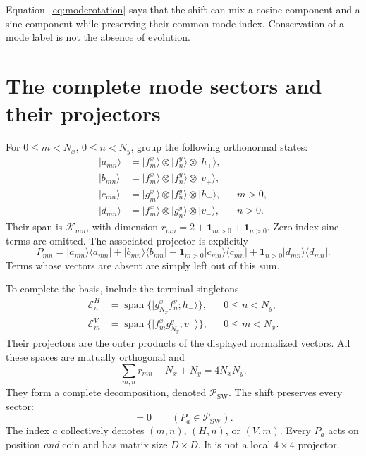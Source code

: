 \documentclass[11pt,a4paper,oneside]{report}
\newcommand{\ket}[1]{\lvert #1\rangle}
\newcommand{\bra}[1]{\langle #1\rvert}
\newcommand{\spanof}{\operatorname{span}}
\newcommand{\sw}{\mathrm{SW}}
\numberwithin{equation}{chapter}
\begin{document}
Equation~\eqref{eq:moderotation} says that the shift can mix a cosine
component and a sine component while preserving their common mode
index. Conservation of a mode label is not the absence of evolution.

\section{The complete mode sectors and their projectors}
\label{sec:projectors}

For \(0\leq m<N_x\), \(0\leq n<N_y\), group the following
orthonormal states:
\begin{align}
\ket{a_{mn}}&=\ket{f_m^x}\otimes\ket{f_n^y}\otimes\ket{h_+},\\
\ket{b_{mn}}&=\ket{f_m^x}\otimes\ket{f_n^y}\otimes\ket{v_+},\\
\ket{c_{mn}}&=\ket{g_m^x}\otimes\ket{f_n^y}\otimes\ket{h_-},
&&m>0,\\
\ket{d_{mn}}&=\ket{f_m^x}\otimes\ket{g_n^y}\otimes\ket{v_-},
&&n>0.
\end{align}
Their span is \(\mathcal K_{mn}\), with dimension
\(r_{mn}=2+\mathbf1_{m>0}+\mathbf1_{n>0}\). Zero-index sine terms
are omitted. The associated projector is explicitly
\begin{equation}
\boxed{
P_{mn}=\ket{a_{mn}}\bra{a_{mn}}
+\ket{b_{mn}}\bra{b_{mn}}
+\mathbf1_{m>0}\ket{c_{mn}}\bra{c_{mn}}
+\mathbf1_{n>0}\ket{d_{mn}}\bra{d_{mn}}.
}
\label{eq:pmn}
\end{equation}
Terms whose vectors are absent are simply left out of this sum.

To complete the basis, include the terminal singletons
\begin{align}
\mathcal E_n^H&=\spanof\{\ket{g_{N_x}^x f_n^y;h_-}\},
&&0\leq n<N_y,\\
\mathcal E_m^V&=\spanof\{\ket{f_m^x g_{N_y}^y;v_-}\},
&&0\leq m<N_x.
\end{align}
Their projectors are the outer products of the displayed normalized
vectors. All these spaces are mutually orthogonal and
\begin{equation}
\sum_{m,n}r_{mn}+N_x+N_y=4N_xN_y.
\end{equation}
They form a complete decomposition, denoted \(\mathscr P_{\sw}\).
The shift preserves every sector:
\begin{equation}
[S,P_a]=0\qquad(P_a\in\mathscr P_{\sw}).
\end{equation}
The index \(a\) collectively denotes \((m,n)\), \((H,n)\), or
\((V,m)\). Every \(P_a\) acts on position \emph{and} coin and has
matrix size \(D\times D\). It is not a local \(4\times4\) projector.
\end{document}
